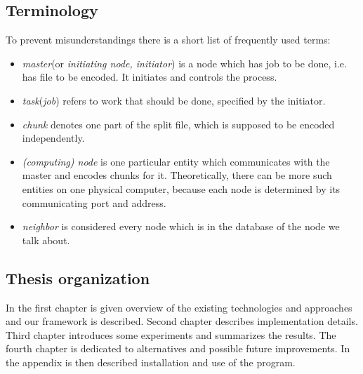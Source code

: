 \subsection*{Terminology}
To prevent misunderstandings there is a short list of frequently used terms:
\begin{itemize}
\item \textit{master}(or \textit{initiating node, initiator}) is a node which has job to be done, i.e. has file to be encoded. It initiates and controls the process.
\item \textit{task}(\textit{job}) refers to work that should be done, specified by the initiator.
\item \textit{chunk} denotes one part of the split file, which is supposed to be encoded independently.
\item \textit{(computing) node} is one particular entity which communicates with the master and encodes chunks for it. Theoretically, there can be more such entities on one physical computer, because each node is determined by its communicating port and address.
\item \textit{neighbor} is considered every node which is in the database of the node we talk about.
\end{itemize}

\subsection*{Thesis organization}
In the first chapter is given overview of the existing technologies and approaches and our framework is described. Second chapter describes implementation details. Third chapter introduces some experiments and summarizes the results. The fourth chapter is dedicated to alternatives and possible future improvements. In the appendix is then described installation and use of the program.